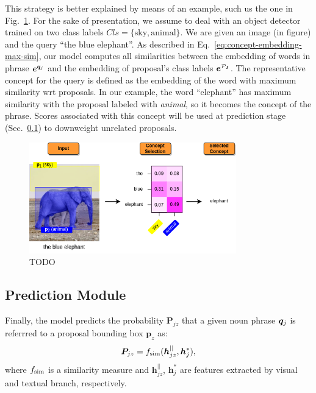 This strategy is better explained by means of an example, such us the
one in Fig.~\ref{fig:concept-selection-example}. For the sake of
presentation, we assume to deal with an object detector trained on two
class labels $Cls = \{ \text{sky}, \text{animal} \}$. We are given an
image (in figure) and the query ``the blue elephant''. As described in
Eq.~\ref{eq:concept-embedding-max-sim}, our model computes all
similarities between the embedding of words in phrase $\bm{e}^{\bm{q}_j}$ and the
embedding of proposal's class labels $\bm{e}^{\mathcal{P}_{\bm{I}}}$. The representative
concept for the query is defined as the embedding of the word with
maximum similarity wrt proposals. In our example, the word
``elephant'' has maximum similarity with the proposal labeled with
\textit{animal}, so it becomes the concept of the phrase. Scores
associated with this concept will be used at prediction stage
(Sec.~\ref{subsec:prediction-module}) to downweight unrelated
proposals.

\begin{figure}
  \centering
  \includegraphics[width=0.8\textwidth]{figures/concept-selection-example.png}
  \caption[Concept selection example]{ TODO }
  \label{fig:concept-selection-example}
\end{figure}

\subsection{Prediction Module}
\label{subsec:prediction-module}

Finally, the model predicts the probability $\bm{P}_{jz}$ that a given
noun phrase $\bm{q}_j$ is referrred to a proposal bounding box $\bm{p}_z$
as:
\begin{equation}
  \bm{P}_{jz} = f_{\text{sim}} ( \bm{h}^{||}_{jz} , \bm{h}^*_j ),
\end{equation}
where $f_{\text{sim}}$ is a similarity measure and $\bm{h}^{||}_{jz}$,
$\bm{h}^*_j$ are features extracted by visual and textual branch,
respectively.

